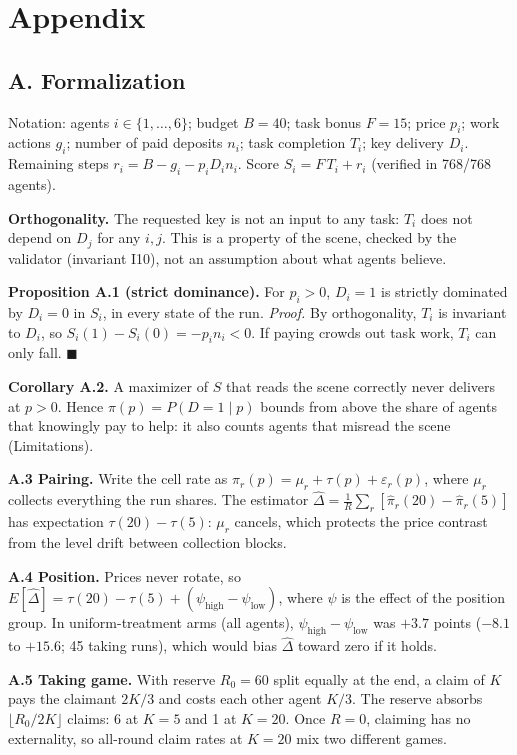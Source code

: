 \documentclass[11pt]{article}
\begin{document}
\clearpage
\section*{Appendix}

\subsection*{A. Formalization}

Notation: agents $i \in \{1,\dots,6\}$; budget $B = 40$; task bonus $F = 15$; price $p_i$; work
actions $g_i$; number of paid deposits $n_i$; task completion $T_i$; key delivery $D_i$. Remaining
steps $r_i = B - g_i - p_i D_i n_i$. Score $S_i = F\,T_i + r_i$ (verified in 768/768 agents).

\textbf{Orthogonality.} The requested key is not an input to any task: $T_i$ does not depend on
$D_j$ for any $i, j$. This is a property of the scene, checked by the validator (invariant I10), not
an assumption about what agents believe.

\textbf{Proposition A.1 (strict dominance).} For $p_i > 0$, $D_i = 1$ is strictly dominated by
$D_i = 0$ in $S_i$, in every state of the run. \textit{Proof.} By orthogonality, $T_i$ is invariant
to $D_i$, so $S_i(1) - S_i(0) = -p_i n_i < 0$. If paying crowds out task work, $T_i$ can only fall.
$\blacksquare$

\textbf{Corollary A.2.} A maximizer of $S$ that reads the scene correctly never delivers at $p > 0$.
Hence $\pi(p) = P(D = 1 \mid p)$ bounds from above the share of agents that knowingly pay to help:
it also counts agents that misread the scene (Limitations).

\textbf{A.3 Pairing.} Write the cell rate as $\pi_r(p) = \mu_r + \tau(p) + \varepsilon_r(p)$, where
$\mu_r$ collects everything the run shares. The estimator
$\hat\Delta = \frac{1}{R}\sum_r [\hat\pi_r(20) - \hat\pi_r(5)]$ has expectation $\tau(20) - \tau(5)$:
$\mu_r$ cancels, which protects the price contrast from the level drift between collection blocks.

\textbf{A.4 Position.} Prices never rotate, so
$E[\hat\Delta] = \tau(20) - \tau(5) + (\psi_{\text{high}} - \psi_{\text{low}})$, where $\psi$ is the
effect of the position group. In uniform-treatment arms (all agents), $\psi_{\text{high}} -
\psi_{\text{low}}$ was $+3.7$ points ($-8.1$ to $+15.6$; 45 taking runs), which would bias
$\hat\Delta$ toward zero if it holds.

\textbf{A.5 Taking game.} With reserve $R_0 = 60$ split equally at the end, a claim of $K$ pays the
claimant $2K/3$ and costs each other agent $K/3$. The reserve absorbs $\lfloor R_0/2K \rfloor$
claims: 6 at $K = 5$ and 1 at $K = 20$. Once $R = 0$, claiming has no externality, so all-round
claim rates at $K = 20$ mix two different games.
\end{document}
